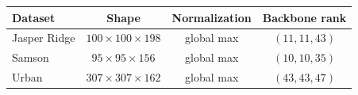 \begin{tabular}{@{}lccc@{}}
\toprule
Dataset & Shape & Normalization & Backbone rank \\
\midrule
Jasper Ridge & $100\times100\times198$ & global max & $(11,11,43)$ \\
Samson & $95\times95\times156$ & global max & $(10,10,35)$ \\
Urban & $307\times307\times162$ & global max & $(43,43,47)$ \\
\bottomrule
\end{tabular}
